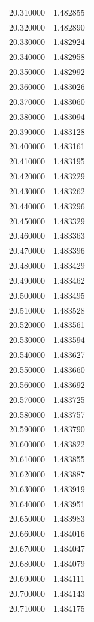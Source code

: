 \begin{tabular}{rr}
20.310000 & 1.482855 \\
20.320000 & 1.482890 \\
20.330000 & 1.482924 \\
20.340000 & 1.482958 \\
20.350000 & 1.482992 \\
20.360000 & 1.483026 \\
20.370000 & 1.483060 \\
20.380000 & 1.483094 \\
20.390000 & 1.483128 \\
20.400000 & 1.483161 \\
20.410000 & 1.483195 \\
20.420000 & 1.483229 \\
20.430000 & 1.483262 \\
20.440000 & 1.483296 \\
20.450000 & 1.483329 \\
20.460000 & 1.483363 \\
20.470000 & 1.483396 \\
20.480000 & 1.483429 \\
20.490000 & 1.483462 \\
20.500000 & 1.483495 \\
20.510000 & 1.483528 \\
20.520000 & 1.483561 \\
20.530000 & 1.483594 \\
20.540000 & 1.483627 \\
20.550000 & 1.483660 \\
20.560000 & 1.483692 \\
20.570000 & 1.483725 \\
20.580000 & 1.483757 \\
20.590000 & 1.483790 \\
20.600000 & 1.483822 \\
20.610000 & 1.483855 \\
20.620000 & 1.483887 \\
20.630000 & 1.483919 \\
20.640000 & 1.483951 \\
20.650000 & 1.483983 \\
20.660000 & 1.484016 \\
20.670000 & 1.484047 \\
20.680000 & 1.484079 \\
20.690000 & 1.484111 \\
20.700000 & 1.484143 \\
20.710000 & 1.484175 \\

\end{tabular}
